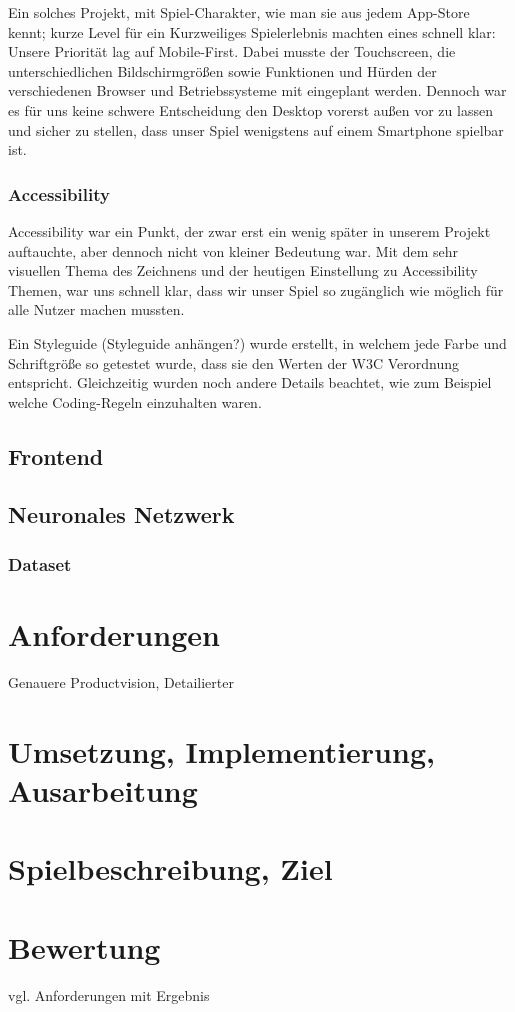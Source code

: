 \documentclass[11pt]{article}
\begin{document}
Ein solches Projekt, mit Spiel-Charakter, wie man sie aus jedem App-Store kennt; kurze Level für ein Kurzweiliges Spielerlebnis machten eines schnell klar: Unsere Priorität lag auf Mobile-First. 
Dabei musste der Touchscreen, die unterschiedlichen Bildschirmgrößen sowie Funktionen und Hürden der verschiedenen Browser und Betriebssysteme mit eingeplant werden. Dennoch war es für uns keine schwere Entscheidung den Desktop vorerst außen vor zu lassen und sicher zu stellen, dass unser Spiel wenigstens auf einem Smartphone spielbar ist. 

\subsubsection{Accessibility}

Accessibility war ein Punkt, der zwar erst ein wenig später in unserem Projekt auftauchte, aber dennoch nicht von kleiner Bedeutung war. Mit dem sehr visuellen Thema des Zeichnens und der heutigen Einstellung zu Accessibility Themen, war uns schnell klar, dass wir unser Spiel so zugänglich wie möglich für alle Nutzer machen mussten. 

Ein Styleguide (Styleguide anhängen?) wurde erstellt, in welchem jede Farbe und Schriftgröße so getestet wurde, dass sie den Werten der W3C Verordnung entspricht.
Gleichzeitig wurden noch andere Details beachtet, wie zum Beispiel welche Coding-Regeln einzuhalten waren.


\subsection{Frontend}
\subsection{Neuronales Netzwerk}
\subsubsection{Dataset}
\section{Anforderungen}
Genauere Productvision, Detailierter
\section{Umsetzung, Implementierung, Ausarbeitung}
\section{Spielbeschreibung, Ziel}
\section{Bewertung}
vgl. Anforderungen mit Ergebnis

\printbibliography
\end{document}
